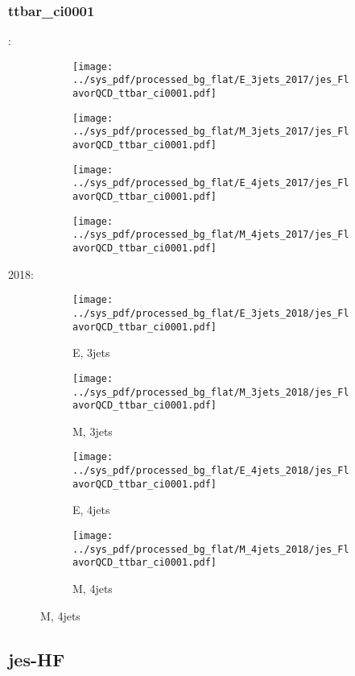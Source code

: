 \documentclass{beamer}
\begin{document}
\begin{frame}
\frametitle{ttbar_ci0001}
\fontsize{5}{1}:
\begin{figure}
\centering
\begin{subfigure}[b]{0.24\textwidth}
\texttt{[image: ../sys\_pdf/processed\_bg\_flat/E\_3jets\_2017/jes\_FlavorQCD\_ttbar\_ci0001.pdf]}
\end{subfigure}
\begin{subfigure}[b]{0.24\textwidth}
\texttt{[image: ../sys\_pdf/processed\_bg\_flat/M\_3jets\_2017/jes\_FlavorQCD\_ttbar\_ci0001.pdf]}
\end{subfigure}
\begin{subfigure}[b]{0.24\textwidth}
\texttt{[image: ../sys\_pdf/processed\_bg\_flat/E\_4jets\_2017/jes\_FlavorQCD\_ttbar\_ci0001.pdf]}
\end{subfigure}
\begin{subfigure}[b]{0.24\textwidth}
\texttt{[image: ../sys\_pdf/processed\_bg\_flat/M\_4jets\_2017/jes\_FlavorQCD\_ttbar\_ci0001.pdf]}
\end{subfigure}
\end{figure}
2018:
\begin{figure}
\centering
\begin{subfigure}[b]{0.24\textwidth}
\texttt{[image: ../sys\_pdf/processed\_bg\_flat/E\_3jets\_2018/jes\_FlavorQCD\_ttbar\_ci0001.pdf]}
\captionsetup{font=tiny}
\caption{E, 3jets}
\end{subfigure}
\begin{subfigure}[b]{0.24\textwidth}
\texttt{[image: ../sys\_pdf/processed\_bg\_flat/M\_3jets\_2018/jes\_FlavorQCD\_ttbar\_ci0001.pdf]}
\captionsetup{font=tiny}
\caption{M, 3jets}
\end{subfigure}
\begin{subfigure}[b]{0.24\textwidth}
\texttt{[image: ../sys\_pdf/processed\_bg\_flat/E\_4jets\_2018/jes\_FlavorQCD\_ttbar\_ci0001.pdf]}
\captionsetup{font=tiny}
\caption{E, 4jets}
\end{subfigure}
\begin{subfigure}[b]{0.24\textwidth}
\texttt{[image: ../sys\_pdf/processed\_bg\_flat/M\_4jets\_2018/jes\_FlavorQCD\_ttbar\_ci0001.pdf]}
\captionsetup{font=tiny}
\caption{M, 4jets}
\end{subfigure}
\end{figure}
\end{frame}


\subsection{jes-HF}
\end{document}
